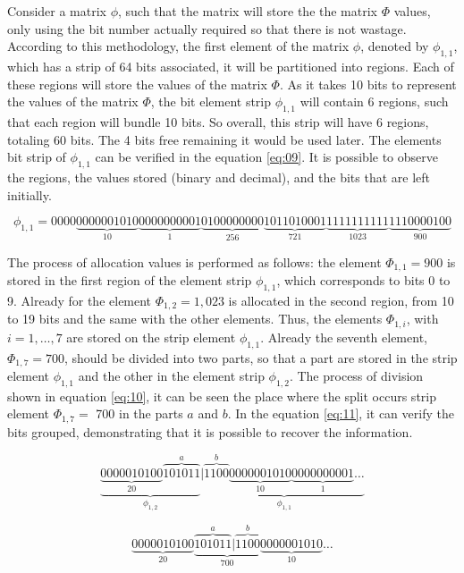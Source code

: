 \documentclass[10pt]{article}
\begin{document}
Consider a matrix $\phi$, such that the matrix will store the the matrix $\Phi$ values, only using the bit number actually required so that there is not wastage. According to this methodology, the first element of the matrix $\phi$, denoted by $\phi_{1,1}$, which has a strip of 64 bits associated, it will be partitioned into regions. Each of these regions will store the values ​​of the matrix $\Phi$. As it takes 10 bits to represent the values ​​of the matrix $\Phi$, the bit element strip $\phi_{1,1}$ will contain 6 regions, such that each region will bundle 10 bits. So overall, this strip will have 6 regions, totaling 60 bits. The 4 bits free remaining it would be used later. The elements bit strip of $\phi_{1,1}$ can be verified in the equation \ref{eq:09}. It is possible to observe the regions, the values ​​stored (binary and decimal), and the bits that are left initially.

\begin{equation}\label{eq:09}
 \phi_{1,1} = 0000\underbrace{0000001010}_{10}\underbrace{0000000001}_{1}\underbrace{0100000000}_{256}\underbrace{1011010001}_{721}\underbrace{1111111111}_{1023}\underbrace{1110000100}_{900} 
\end{equation}

The process of allocation values ​​is performed as follows: the element $\Phi_{1,1}=900$ is stored in the first region of the element strip $\phi_{1,1} $, which corresponds to bits 0 to 9. Already for the element $\Phi_{1,2}=1,023$ is allocated in the second region, from 10 to 19 bits and the same with the other elements. Thus, the elements $\Phi_{1,i}$, with $i=1,\ldots,7$ are stored on the strip element $\phi_{1,1}$. Already the seventh element, $\Phi_{1,7}=700$, should be divided into two parts, so that a part are stored in the strip element $\phi_{1,1}$ and the other in the element strip $\phi_{1,2}$. The process of division shown in equation \ref{eq:10}, it can be seen the place where the split occurs strip element $\Phi_{1,7}=$ 700 in the parts $a$ and $b$. In the equation \ref{eq:11}, it can verify the bits grouped, demonstrating that it is possible to recover the information.

\begin{equation}\label{eq:10}
  \underbrace{\underbrace{0000010100}_{20}\overbrace{101011}^{a}}_{\phi_{1,2}}|\underbrace{\overbrace{1100}^{b}\underbrace{0000001010}_{10}\underbrace{0000000001}_{1}\hdots}_{\phi_{1,1}}
\end{equation}

\begin{equation}\label{eq:11}
  \underbrace{0000010100}_{20}\underbrace{\overbrace{101011}^a|\overbrace{1100}^{b}}_{700}\underbrace{0000001010}_{10}\ldots
\end{equation}
\end{document}
